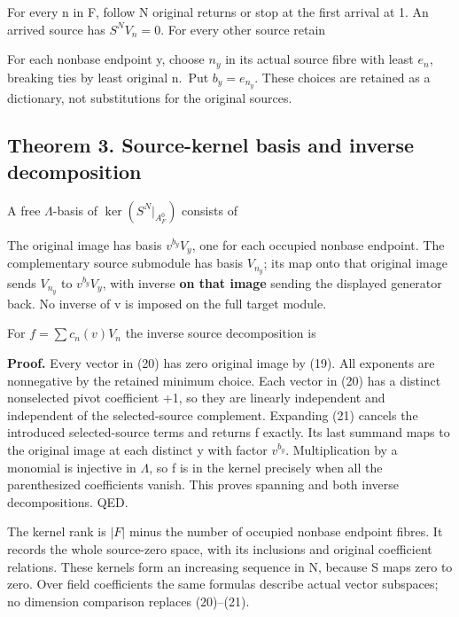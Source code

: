 For every n in F, follow N original returns or stop at the first arrival
at 1. An arrived source has \(S^NV_n=0\). For every other source retain


For each nonbase endpoint y, choose \(n_y\) in its actual source fibre
with least \(e_n\), breaking ties by least original n.~Put
\(b_y=e_{n_y}\). These choices are retained as a dictionary, not
substitutions for the original sources.

\subsection{Theorem 3. Source-kernel basis and inverse decomposition}

A free \(\Lambda\)-basis of \(\ker(S^N|_{A_F^0})\) consists of

 

The original image has basis \(v^{b_y}V_y\), one for each occupied
nonbase endpoint. The complementary source submodule has basis
\(V_{n_y}\); its map onto that original image sends \(V_{n_y}\) to
\(v^{b_y}V_y\), with inverse \textbf{on that image} sending the
displayed generator back. No inverse of v is imposed on the full target
module.

For \(f=\sum c_n(v)V_n\) the inverse source decomposition is


\textbf{Proof.} Every vector in (20) has zero original image by (19).
All exponents are nonnegative by the retained minimum choice. Each
vector in (20) has a distinct nonselected pivot coefficient +1, so they
are linearly independent and independent of the selected-source
complement. Expanding (21) cancels the introduced selected-source terms
and returns f exactly. Its last summand maps to the original image at
each distinct y with factor \(v^{b_y}\). Multiplication by a monomial is
injective in \(\Lambda\), so f is in the kernel precisely when all the
parenthesized coefficients vanish. This proves spanning and both inverse
decompositions. QED.

The kernel rank is \(|F|\) minus the number of occupied nonbase endpoint
fibres. It records the whole source-zero space, with its inclusions and
original coefficient relations. These kernels form an increasing
sequence in N, because S maps zero to zero. Over field coefficients the
same formulas describe actual vector subspaces; no dimension comparison
replaces (20)--(21).

